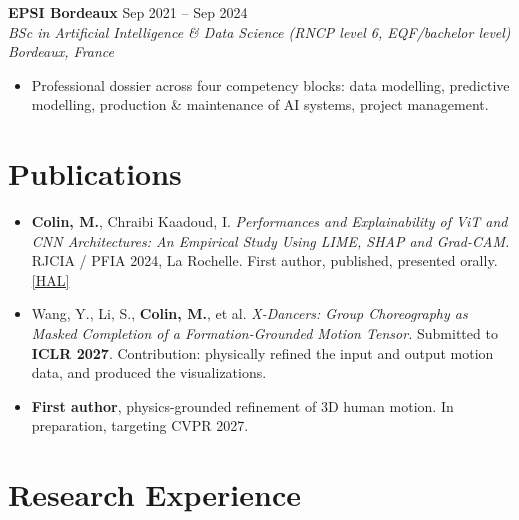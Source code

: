 \documentclass[10pt, letterpaper]{article}
\newcommand{\entry}[4]{%
  \noindent \textbf{#1} \hfill #2 \\
  \textit{#3} \hfill \textit{#4} \par
}
\begin{document}
\vspace{4pt}

\entry{EPSI Bordeaux}{Sep 2021 -- Sep 2024}%
{BSc in Artificial Intelligence \& Data Science (RNCP level 6, EQF/bachelor level)}{Bordeaux, France}
\begin{itemize}
    \item Professional dossier across four competency blocks: data modelling, predictive modelling, production \& maintenance of AI systems, project management.
\end{itemize}

\section{Publications}

\begin{itemize}
    \item \textbf{Colin, M.}, Chraibi Kaadoud, I. \textit{Performances and Explainability of ViT and CNN Architectures: An Empirical Study Using LIME, SHAP and Grad-CAM.} RJCIA / PFIA 2024, La Rochelle. First author, published, presented orally.
    \hfill \href{https://hal.science/hal-04641791}{[HAL]}
    \item Wang, Y., Li, S., \textbf{Colin, M.}, et al. \textit{X-Dancers: Group Choreography as Masked Completion of a Formation-Grounded Motion Tensor.} Submitted to \textbf{ICLR 2027}. Contribution: physically refined the input and output motion data, and produced the visualizations.
    \item \textbf{First author}, physics-grounded refinement of 3D human motion. In preparation, targeting CVPR 2027.
\end{itemize}

\section{Research Experience}
\end{document}
